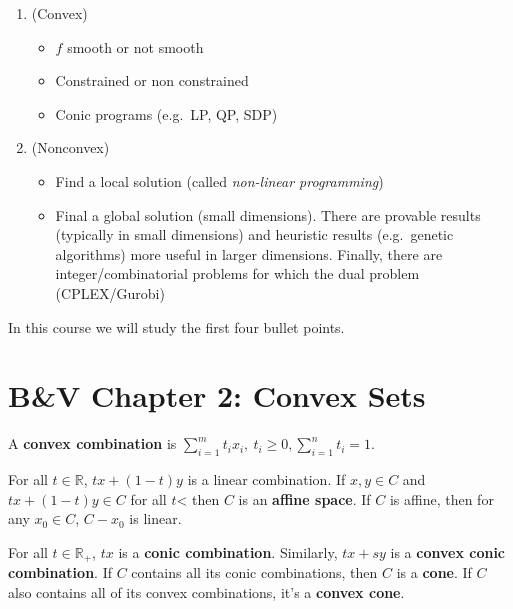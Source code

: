 \documentclass[english, 11pt]{article}
\begin{document}
\begin{enumerate}

\item (Convex)
\begin{itemize}

\item $f$ smooth or not smooth

\item Constrained or non constrained

\item Conic programs (e.g.\ LP, QP, SDP)

\end{itemize}

\item (Nonconvex)

\begin{itemize}
\item Find a local solution (called {\it non-linear programming})

\item Final a global solution (small dimensions). There are provable results (typically in small dimensions) and heuristic results (e.g.\ genetic algorithms) more useful in larger dimensions. Finally, there are integer/combinatorial problems for which the dual problem (CPLEX/Gurobi)
\end{itemize}

\end{enumerate}

In this course we will study the first four bullet points.


\section{B\&V Chapter 2: Convex Sets}
\begin{defn}
A {\bf convex combination} is
$
\displaystyle \sum_{i=1}^m t_i x_i, \ t_i \ge 0, \sum_{i=1}^n t_i =1.
$
\end{defn}


\begin{defn}
For all $t \in \mathbb{R}$, $t x + (1-t) y$ is a linear combination. If $x,y \in C$ and $tx + (1-t) y \in C$ for all $t$< then $C$ is an {\bf affine space}. If $C$ is affine, then for any $x_0 \in C$, $C-x_0$ is linear.
\end{defn}

\begin{defn}
For all $t \in \mathbb{R}_+$, $t x$ is a {\bf conic combination}. Similarly, $tx + sy$ is a {\bf convex conic combination}. If $C$ contains all its conic combinations, then $C$ is a {\bf cone}. If $C$ also contains all of its convex combinations, it's a {\bf convex cone}.
\end{defn}
\end{document}
